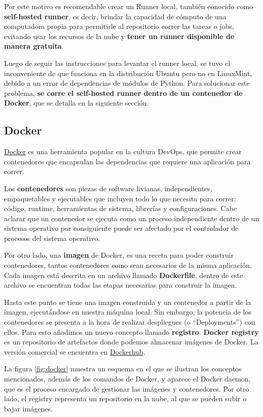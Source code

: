 Por este motivo es recomendable crear un Runner local, también conocido como \textbf{self-hosted runner}, es decir, brindar la capacidad de cómputo de una computadora propia para permitirle al repositorio correr las tareas o jobs, evitando usar los recursos de la nube y \textbf{tener un runner disponible de manera gratuita}.

Luego de seguir las instrucciones para levantar el runner local, se tuvo el inconveniente de que funciona en la distribución Ubuntu pero no en LinuxMint, debido a un error de dependencias de módulos de Python. Para solucionar este problema, \textbf{se corre el self-hosted runner dentro de un contenedor de Docker}, que se detalla en la siguiente sección.

\subsection{Docker}

\href{https://www.docker.com/}{Docker} es una herramienta popular en la cultura DevOps, que permite crear contenedores que encapsulan las dependencias que requiere una aplicación para correr.

Los \textbf{contenedores} son piezas de software livianas, independientes, empaquetables y ejecutables que incluyen todo lo que necesita para correr: código, runtime, herramientas de sistema, librerías y configuraciones. Cabe aclarar que un contenedor se ejecuta como un proceso independiente dentro de un sistema operativo por consiguiente puede ser afectado por el controlador de procesos del sistema operativo.

Por otro lado, una \textbf{imagen} de Docker, es una receta para poder construir contenedores, tantos contenedores como sean necesarios de la misma aplicación. Cada imagen está descrita en un archivo llamado \textbf{Dockerfile}, dentro de este archivo se encuentran todas las etapas necesarias para construir la imagen.

Hasta este punto se tiene una imagen construida y un contenedor a partir de la imagen, ejecutándose en nuestra máquina local. Sin embargo, la potencia de los contenedores se presenta a la hora de realizar despliegues (o ``Deployments'') con ellos. Para esto añadimos un nuevo concepto llamado \textbf{registro}. \textbf{Docker registry} es un repositorio de artefactos donde podemos almacenar imágenes de Docker. La versión comercial se encuentra en \href{https://hub.docker.com}{Dockerhub}.

La figura \ref{fig:docker} muestra un esquema en el que se ilustran los conceptos mencionados, además de los comandos de Docker, y aparece el Docker daemon, que es el proceso encargado de gestionar las imágenes y contenedores. Por otro lado, el registry representa un repositorio en la nube, al que se pueden subir o bajar imágenes.

